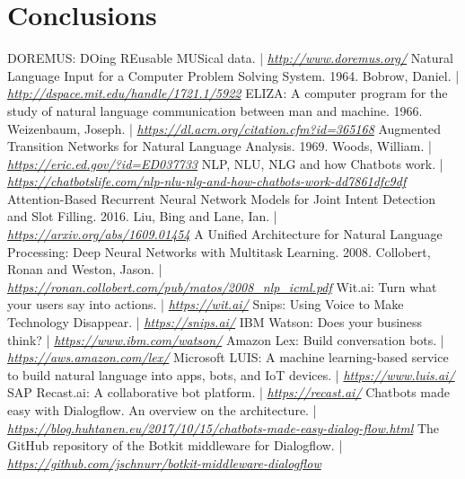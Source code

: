 \documentclass[a4paper,12pt]{report}
\begin{document}
	\chapter{Conclusions}
	
	\begin{thebibliography}{9}
		 DOREMUS: DOing REusable MUSical data. | \textit{\href{http://www.doremus.org/}{http://www.doremus.org/}}
		 Natural Language Input for a Computer Problem Solving System. 1964. Bobrow, Daniel. | \textit{\href{http://dspace.mit.edu/handle/1721.1/5922}{http://dspace.mit.edu/handle/1721.1/5922}}
		 ELIZA: A computer program for the study of natural language communication between man and machine. 1966. Weizenbaum, Joseph. | \textit{\href{https://dl.acm.org/citation.cfm?id=365168}{https://dl.acm.org/citation.cfm?id=365168}}
		 Augmented Transition Networks for Natural Language Analysis. 1969. Woods, William. | \textit{\href{https://eric.ed.gov/?id=ED037733}{https://eric.ed.gov/?id=ED037733}}
		 NLP, NLU, NLG and how Chatbots work. | \textit{\href{https://chatbotslife.com/nlp-nlu-nlg-and-how-chatbots-work-dd7861dfc9df}{https://chatbotslife.com/nlp-nlu-nlg-and-how-chatbots-work-dd7861dfc9df}}
		 Attention-Based Recurrent Neural Network Models for Joint Intent Detection and Slot Filling. 2016. Liu, Bing and Lane, Ian. | \textit{\href{https://arxiv.org/abs/1609.01454}{https://arxiv.org/abs/1609.01454}}
		 A Unified Architecture for Natural Language Processing: Deep Neural Networks with Multitask Learning. 2008. Collobert, Ronan and Weston, Jason. | \textit{\href{https://ronan.collobert.com/pub/matos/2008\_nlp\_icml.pdf}{https://ronan.collobert.com/pub/matos/2008\_nlp\_icml.pdf}}
		 Wit.ai: Turn what your users say into actions. | \textit{\href{https://wit.ai/}{https://wit.ai/}}
		 Snips: Using Voice to Make Technology Disappear. | \textit{\href{https://snips.ai/}{https://snips.ai/}}
		 IBM Watson: Does your business think? | \textit{\href{https://www.ibm.com/watson/}{https://www.ibm.com/watson/}}
		 Amazon Lex: Build conversation bots. | \textit{\href{https://aws.amazon.com/lex/}{https://aws.amazon.com/lex/}}
		 Microsoft LUIS: A machine learning-based service to build natural language into apps, bots, and IoT devices. | \textit{\href{https://www.luis.ai/}{https://www.luis.ai/}}
		 SAP Recast.ai: A collaborative bot platform. | \textit{\href{https://recast.ai/}{https://recast.ai/}}
		 Chatbots made easy with Dialogflow. An overview on the architecture. | \textit{\href{https://blog.huhtanen.eu/2017/10/15/chatbots-made-easy-dialog-flow.html}{https://blog.huhtanen.eu/2017/10/15/chatbots-made-easy-dialog-flow.html}}
		 The GitHub repository of the Botkit middleware for Dialogflow. | \textit{\href{https://github.com/jschnurr/botkit-middleware-dialogflow}{https://github.com/jschnurr/botkit-middleware-dialogflow}}
	\end{thebibliography}
\end{document}

